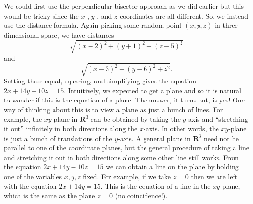 \documentclass[11pt]{article}
\renewcommand{\R}{\mathbf{R}}
\begin{document}
\begin{enum}{\alph}
\item We could first use the perpendicular bisector approach as we did earlier but this would be tricky since the $x$-, $y$-, and $z$-coordinates are all different. So, we instead use the distance formula. Again picking some random point $(x,y,z)$ in three-dimensional space, we have distances 
$$\sqrt{(x-2)^2+(y+1)^2+(z-5)^2}$$
and
$$\sqrt{(x-3)^2+(y-6)^2+z^2}.$$
Setting these equal, squaring, and simplifying gives the equation $2x+14y-10z=15$. Intuitively, we expected to get a plane and so it is natural to wonder if this is the equation of a plane. The answer, it turns out, is yes! One way of thinking about this is to view a plane as just a bunch of lines. For example, the $xy$-plane in $\R^3$ can be obtained by taking the $y$-axis and ``stretching it out'' infinitely in both directions along the $x$-axis. In other words, the $xy$-plane is just a bunch of translations of the $y$-axis. A general plane in $\R^3$ need not be parallel to one of the coordinate planes, but the general procedure of taking a line and stretching it out in both directions along some other line still works. From the equation $2x+14y-10z=15$ we can obtain a line on the plane by holding one of the variables $x,y,z$ fixed. For example, if we take $z=0$ then we are left with the equation $2x+14y=15$. This is the equation of a line in the $xy$-plane, which is the same as the plane $z=0$ (no coincidence!).
\end{enum}
\end{document}
